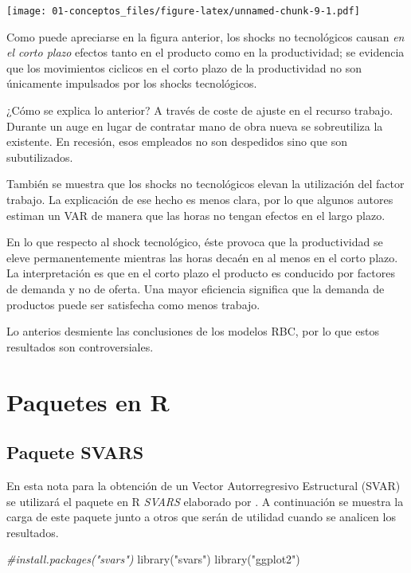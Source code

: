 \documentclass[
]{book}
\newenvironment{Shaded}{\begin{snugshade}}{\end{snugshade}}
\newcommand{\CommentTok}[1]{\textcolor[rgb]{0.56,0.35,0.01}{\textit{#1}}}
\newcommand{\FunctionTok}[1]{\textcolor[rgb]{0.00,0.00,0.00}{#1}}
\newcommand{\NormalTok}[1]{#1}
\newcommand{\StringTok}[1]{\textcolor[rgb]{0.31,0.60,0.02}{#1}}
\begin{document}
\texttt{[image: 01-conceptos\_files/figure-latex/unnamed-chunk-9-1.pdf]}

Como puede apreciarse en la figura anterior, los shocks no tecnológicos causan \emph{en el corto plazo} efectos tanto en el producto como en la productividad; se evidencia que los movimientos ciclicos en el corto plazo de la productividad no son únicamente impulsados por los shocks tecnológicos.

¿Cómo se explica lo anterior? A través de coste de ajuste en el recurso trabajo. Durante un auge en lugar de contratar mano de obra nueva se sobreutiliza la existente. En recesión, esos empleados no son despedidos sino que son subutilizados.

También se muestra que los shocks no tecnológicos elevan la utilización del factor trabajo. La explicación de ese hecho es menos clara, por lo que algunos autores estiman un VAR de manera que las horas no tengan efectos en el largo plazo.

En lo que respecto al shock tecnológico, éste provoca que la productividad se eleve permanentemente mientras las horas decaén en al menos en el corto plazo. La interpretación es que en el corto plazo el producto es conducido por factores de demanda y no de oferta. Una mayor eficiencia significa que la demanda de productos puede ser satisfecha como menos trabajo.

Lo anterios desmiente las conclusiones de los modelos RBC, por lo que estos resultados son controversiales.

\hypertarget{paquetes-en-r}{%
\chapter{Paquetes en R}\label{paquetes-en-r}}

\hypertarget{paquete-svars}{%
\section{Paquete SVARS}\label{paquete-svars}}

En esta nota para la obtención de un Vector Autorregresivo Estructural (SVAR) se utilizará el paquete en R \emph{SVARS} elaborado por \citet{SVAR21}. A continuación se muestra la carga de este paquete junto a otros que serán de utilidad cuando se analicen los resultados.

\begin{Shaded}
\begin{Highlighting}[]
\CommentTok{\#install.packages("svars")}
\FunctionTok{library}\NormalTok{(}\StringTok{"svars"}\NormalTok{)}
\FunctionTok{library}\NormalTok{(}\StringTok{"ggplot2"}\NormalTok{)}
\end{Highlighting}
\end{Shaded}
\end{document}
